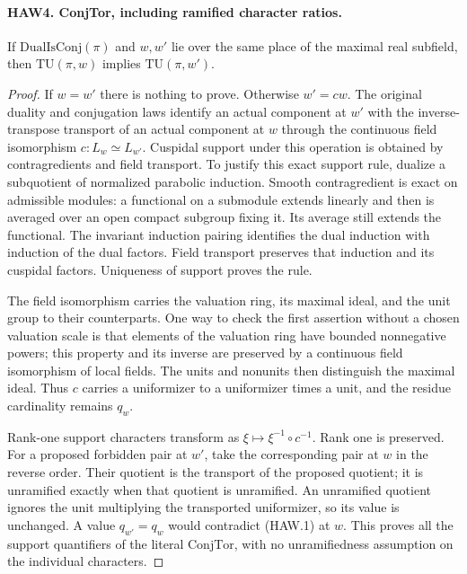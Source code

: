 \paragraph{HAW4. ConjTor, including ramified character ratios.}
\label{claim:HAW4}
If $\mathrm{DualIsConj}(\pi)$ and $w,w'$ lie over the same
place of the maximal real subfield, then
$\mathrm{TU}(\pi,w)$ implies $\mathrm{TU}(\pi,w')$.
\begin{proof}
If $w=w'$ there is nothing to prove.  Otherwise $w'=cw$.
The original duality and conjugation laws identify an actual
component at $w'$ with the inverse-transpose transport of an
actual component at $w$ through the continuous field
isomorphism $c:L_w\simeq L_{w'}$.  Cuspidal support under
this operation is obtained by contragredients and field
transport.  To justify this exact support rule, dualize a
subquotient of normalized parabolic induction.  Smooth
contragredient is exact on admissible modules: a functional
on a submodule extends linearly and then is averaged over
an open compact subgroup fixing it.  Its average still
extends the functional.  The invariant induction pairing
identifies the dual induction with induction of the dual
factors.  Field transport preserves that induction and its
cuspidal factors.  Uniqueness of support proves the rule.

The field isomorphism carries the valuation ring, its maximal
ideal, and the unit group to their counterparts.  One way to
check the first assertion without a chosen valuation scale is
that elements of the valuation ring have bounded nonnegative
powers; this property and its inverse are preserved by a
continuous field isomorphism of local fields.  The units and
nonunits then distinguish the maximal ideal.  Thus $c$ carries
a uniformizer to a uniformizer times a unit, and the residue
cardinality remains $q_w$.

Rank-one support characters transform as
$\xi\mapsto\xi^{-1}\circ c^{-1}$.  Rank one is preserved.
For a proposed forbidden pair at $w'$, take the corresponding
pair at $w$ in the reverse order.  Their quotient is the
transport of the proposed quotient; it is unramified exactly
when that quotient is unramified.  An unramified quotient
ignores the unit multiplying the transported uniformizer, so
its value is unchanged.  A value $q_{w'}=q_w$ would contradict
(HAW.1) at $w$.  This proves all the support quantifiers of
the literal $\mathrm{ConjTor}$, with no unramifiedness
assumption on the individual characters.
\end{proof}

